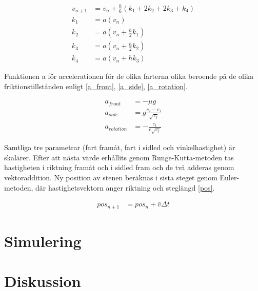 \documentclass[11pt]{article} %
\begin{document}
 \begin{subequations}\label{RungeKutta_transl}
 \begin{align}
 v_{n+1}& =v_n + \frac{h}{6} (k_1+2 k_2 + 2 k_3 + k_4)\\
 k_1& = a(v_n)\\
 k_2& = a(v_n + \frac{h}{2} k_1)\\
 k_3& = a(v_n + \frac{h}{2} k_2)\\
 k_4& = a(v_n + h k_3)
 \end{align}
\end{subequations}

Funktionen a för accelerationen för de olika farterna olika beroende på de olika friktionstillstånden enligt \eqref{a_front},  \eqref{a_side}, \eqref{a_rotation}.
 
 \begin{align}\label{a_front}
 a_{front}& = - \mu g\\\label{a_side}
 a_{side}& = g \frac{c_2-c_1}{\sqrt{v_f}}\\\label{a_rotation}
 a_{rotation}& = - \frac{c_1}{r \sqrt{v_f}}
 \end{align}

Samtliga tre parametrar (fart framåt, fart i sidled och vinkelhastighet) är skalärer. Efter att nästa värde erhållits genom Runge-Kutta-metoden tas hastigheten i riktning framåt och i sidled fram och de två adderas genom vektoraddition. Ny position av stenen beräknas i sista steget genom Euler-metoden, där hastighetsvektorn anger riktning och steglängd \eqref{pos}. 

 \begin{align}\label{pos}
 pos_{n+1}& = pos_{n} + \bar{v} \Delta t
 \end{align}



\section{Simulering}

\section{Diskussion}
\end{document}

